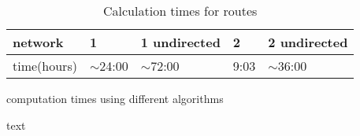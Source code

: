\begin{table}[]
\centering
\begin{tabular}{@{}l|llll@{}}
network     & 1           & 1 undirected & 2    & 2 undirected \\ \hline
time(hours) & $\sim$24:00 & $\sim$72:00  & 9:03 & $\sim$36:00 
\end{tabular}
\caption{Calculation times for routes}
\label{table:net_calc_times}
\end{table}

\begin{table}
\centering
\caption{computation times using different algorithms}
\label{table:comp_times_algo}
\end{table}


text